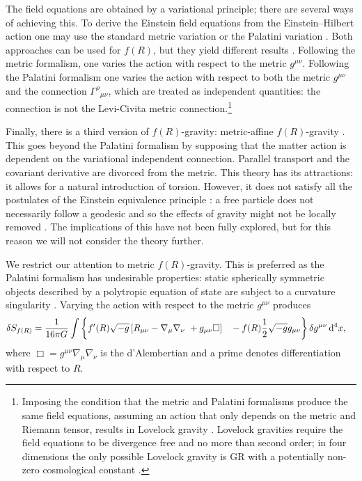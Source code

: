The field equations are obtained by a variational principle; there are several ways of achieving this. To derive the Einstein field equations from the Einstein--Hilbert action one may use the standard metric variation or the Palatini variation \citep[section 21.2]{Misner1973}. Both approaches can be used for $f(R)$, but they yield different results \citep{Sotiriou2010, DeFelice2010}. Following the metric formalism, one varies the action with respect to the metric $g^{\mu\nu}$. Following the Palatini formalism one varies the action with respect to both the metric $g^{\mu\nu}$ and the connection ${\Gamma^\rho}_{\mu\nu}$, which are treated as independent quantities: the connection is not the Levi-Civita metric connection.\footnote{Imposing the condition that the metric and Palatini formalisms produce the same field equations, assuming an action that only depends on the metric and Riemann tensor, results in Lovelock gravity \citep{Exirifard2008}. Lovelock gravities require the field equations to be divergence free and no more than second order; in four dimensions the only possible Lovelock gravity is GR with a potentially non-zero cosmological constant \citep{Lovelock1970, Lovelock1971, Lovelock1972}.}

Finally, there is a third version of $f(R)$-gravity: metric-affine $f(R)$-gravity \citep{Sotiriou2007, Sotiriou2007b}. This goes beyond the Palatini formalism by supposing that the matter action is dependent on the variational independent connection. Parallel transport and the covariant derivative are divorced from the metric. This theory has its attractions: it allows for a natural introduction of torsion. However, it does not satisfy all the postulates of the Einstein equivalence principle \citep{Will2006}: a free particle does not necessarily follow a geodesic and so the effects of gravity might not be locally removed \citep{Exirifard2008}. The implications of this have not been fully explored, but for this reason we will not consider the theory further.

We restrict our attention to metric $f(R)$-gravity. This is preferred as the Palatini formalism has undesirable properties: static spherically symmetric objects described by a polytropic equation of state are subject to a curvature singularity \citep{Barausse2008b, Barausse2008a, DeFelice2010}. Varying the action with respect to the metric $g^{\mu\nu}$ produces
\begin{align}
\delta S_{f(R)} = {} & \recip{16\pi G}\int\left\{f'(R)\sqrt{-g}\left[R_{\mu\nu} - \nabla_\mu\nabla_\nu\ + g_{\mu\nu}\Box\right] \hphantom{\dfrac{0}{0}} \vphantom{\dfrac{0}{0}} - f(R)\recip{2}\sqrt{-g}g_{\mu\nu}\right\}\delta g^{\mu\nu}\,\dd^4x,
\end{align}
where $\Box = g^{\mu\nu}\nabla_\mu\nabla_\nu$ is the d'Alembertian and a prime denotes differentiation with respect to $R$.

